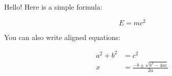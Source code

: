 \documentclass{article}  %
\begin{document}
Hello! Here is a simple formula:

\[
E = mc^2
\]

You can also write aligned equations:

\begin{align}
a^2 + b^2 &= c^2 \\
x &= \frac{-b \pm \sqrt{b^2 - 4ac}}{2a}
\end{align}
\end{document}

